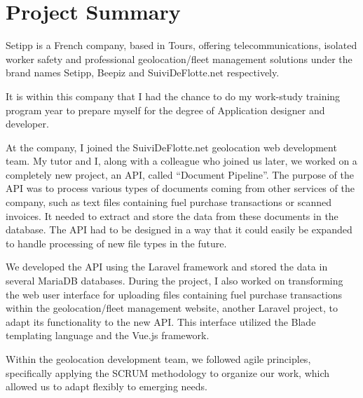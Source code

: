 \chapter{Project Summary}\label{ch:project-summary}


Setipp is a French company, based in Tours, offering telecommunications, isolated worker safety and professional geolocation/fleet management solutions under the brand names Setipp, Beepiz and SuiviDeFlotte.net respectively.

It is within this company that I had the chance to do my work-study training program year to prepare myself for the degree of Application designer and developer.

At the company, I joined the SuiviDeFlotte.net geolocation web development team. My tutor and I, along with a colleague who joined us later, we worked on a completely new project, an API, called \foreignquote{french}{Document Pipeline}. The purpose of the API was to process various types of documents coming from other services of the company, such as text files containing fuel purchase transactions or scanned invoices. It needed to extract and store the data from these documents in the database. The API had to be designed in a way that it could easily be expanded to handle processing of new file types in the future.

We developed the API using the Laravel framework and stored the data in several MariaDB databases. During the project, I also worked on transforming the web user interface for uploading files containing fuel purchase transactions within the geolocation/fleet management website, another Laravel project, to adapt its functionality to the new API. This interface utilized the Blade templating language and the Vue.js framework.

Within the geolocation development team, we followed agile principles, specifically applying the SCRUM methodology to organize our work, which allowed us to adapt flexibly to emerging needs.